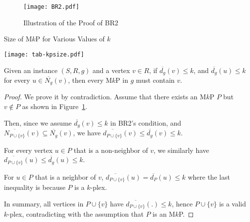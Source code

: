 \documentclass[sigconf, nonacm]{acmart}
\begin{document}
\begin{figure}[t]
  \texttt{[image: BR2.pdf]}
  \caption{Illustration of the Proof of BR2}\label{fig:BR2}
   \vspace{3mm}
\end{figure}

\begin{table*}
  \caption{Size of M$k$P for Various Values of $k$}\label{tab-kpsize}
  \texttt{[image: tab-kpsize.pdf]}
\end{table*}

\vspace{1mm}
 Given an instance $(S, R, g)$ and a vertex $v\in R$, if $\overline{d_g}(v)\le k$, and $\overline{d_g}(u)\le k$ for every $u\in \overline{N_g}(v)$, then every M$k$P in $g$ must contain $v$. 

\begin{proof}
We prove it by contradiction. Assume that there exists an M$k$P $P$ but $v\notin P$ as shown in Figure~\ref{fig:BR2}.

Then, since we assume $\overline{d_g}(v)\le k$ in BR2's condition, and $\overline{N_{P\cup\{v\}}}(v)\subseteq \overline{N_g}(v)$, we have $\overline{d_{P\cup\{v\}}}(v)\le \overline{d_g}(v)\le k$. 

For every vertex $u\in P$ that is a non-neighbor of $v$, we similarly have $\overline{d_{P\cup\{v\}}}(u)\le \overline{d_g}(u)\le k$.

For $u\in P$ that is a neighbor of $v$, $\overline{d_{P\cup\{v\}}}(u)=\overline{d_{P}}(u)\leq k$ where the last inequality is because $P$ is a $k$-plex.

In summary, all vertices in $P\cup \{v\}$ have $\overline{d_{P\cup\{v\}}}(.)\le k$, hence $P\cup \{v\}$ is a valid $k$-plex, contradicting with the assumption that $P$ is an M$k$P. 
\end{proof}
\end{document}
